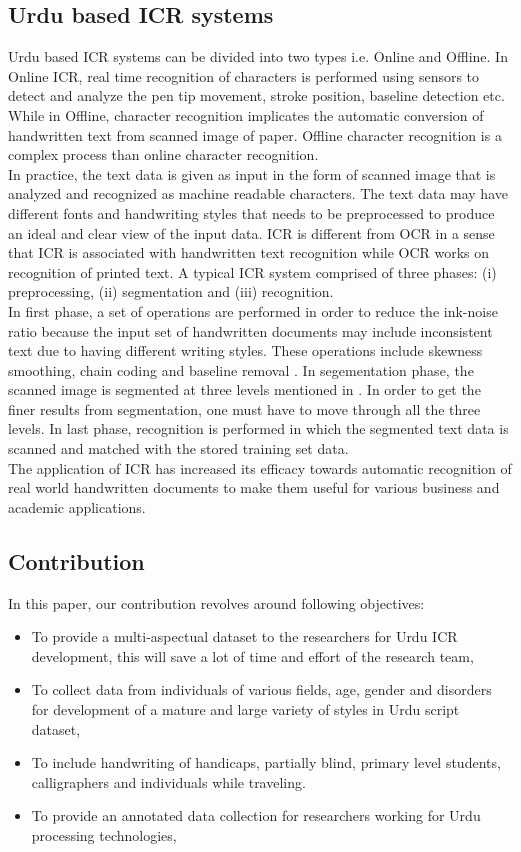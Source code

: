 \documentclass[a4paper,conference]{IEEEtran}
\begin{document}
\subsection{Urdu based ICR systems}
Urdu based ICR systems can be divided into two types i.e. Online and Offline. In Online ICR, real time recognition of characters is performed using sensors to detect and analyze the pen tip movement, stroke position, baseline detection etc. While in Offline, character recognition implicates the automatic conversion of handwritten text from scanned image of paper. Offline character recognition is a complex process than online character recognition\cite{8,9,10}. \\
In practice, the text data is given as input in the form of scanned image that is analyzed and recognized as machine readable characters. The text data may have different fonts and handwriting styles that needs to be preprocessed to produce an ideal and clear view of the input data. ICR is different from OCR in a sense that ICR is associated with handwritten text recognition while OCR works on recognition of printed text. A typical ICR system comprised of three phases: (i) preprocessing, (ii) segmentation and (iii) recognition.\\ 
In first phase, a set of operations are performed in order to reduce the ink-noise ratio because the input set of handwritten documents may include inconsistent text due to having different writing styles. These operations include skewness smoothing, chain coding and baseline removal \cite{5, 7}. In segementation phase, the scanned image is segmented at three levels mentioned in \cite{8,9}. In order to get the finer results from segmentation, one must have to move through all the three levels. In last phase, recognition is performed in which the segmented text data is scanned and matched with the stored training set data.\\ 
The application of ICR has increased its efficacy towards automatic recognition of real world handwritten documents to make them useful for various business and academic applications.

\subsection{Contribution}
In this paper, our contribution revolves around following objectives:
\begin{itemize}
\item To provide a multi-aspectual dataset to the researchers for Urdu ICR development, this will save a lot of time and effort of the research team,
\item To collect data from individuals of various fields, age, gender and disorders for development of a mature and large variety of styles in Urdu script dataset,
\item To include handwriting of handicaps, partially blind, primary level students, calligraphers and individuals while traveling.
\item To provide an annotated data collection for researchers working for Urdu processing technologies, 


\end{itemize}
\end{document}
